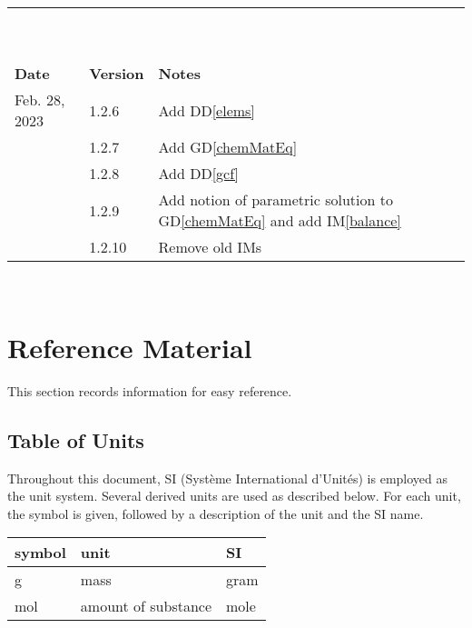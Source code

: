 \documentclass[12pt]{article}
\newcommand{\gdref}[1]{GD\ref{#1}}
\newcommand{\ddref}[1]{DD\ref{#1}}
\newcommand{\iref}[1]{IM\ref{#1}}
\begin{document}
\begin{tabularx}{\textwidth}{p{2.5cm}p{1.5cm}X}
  \bottomrule~                                                                                               \\
  ~                                                                                                          \\
  \toprule {\bf Date} & {\bf Version} & {\bf Notes}                                                          \\
  \midrule
  Feb. 28, 2023       & 1.2.6         & Add \ddref{elems}                                                    \\
                      & 1.2.7         & Add \gdref{chemMatEq}                                                \\
                      & 1.2.8         & Add \ddref{gcf}                                                      \\
                      & 1.2.9         & Add notion of parametric solution to \gdref{chemMatEq} and add
  \iref{balance}                                                                                             \\
                      & 1.2.10        & Remove old IMs                                                       \\
  \bottomrule
\end{tabularx}

~\newpage

\section{Reference Material} \label{sec_refMat}

This section records information for easy reference.

\subsection{Table of Units} \label{sec_ToU}

Throughout this document, SI (Syst\`{e}me International d'Unit\'{e}s) is employed
as the unit system.
Several derived units are
used as described below.  For each unit, the symbol is given, followed by a
description of the unit and the SI name.
~\newline

\renewcommand{\arraystretch}{1.2}
\noindent \begin{tabular}{l l l}
  \toprule
  \textbf{symbol} & \textbf{unit}       & \textbf{SI} \\
  \midrule
  \si{\gram}      & mass                & gram        \\
  \si{\mole}      & amount of substance & mole        \\
  \bottomrule
\end{tabular}
\end{document}
